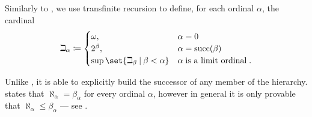 \begin{definition}\label{def:beth_hierarchy}
  Similarly to , we use transfinite recursion to define, for each ordinal \( \alpha \), the cardinal
  \begin{equation}\label{eq:def:beth_hierarchy}
    \beth_\alpha \coloneqq \begin{cases}
      \omega,                                       &\alpha = 0 \\
      2^\beta,                                      &\alpha = \op{succ}(\beta) \\
      \sup\set{ \beth_\beta \given \beta < \alpha } &\alpha \T{is a limit ordinal}.
    \end{cases}
  \end{equation}

  Unlike , it is able to explicitly build the successor of any member of the hierarchy.  states that \( \aleph_\alpha = \beta_\alpha \) for every ordinal \( \alpha \), however in general it is only provable that \( \aleph_\alpha \leq \beta_\alpha \) --- see .
\end{definition}

